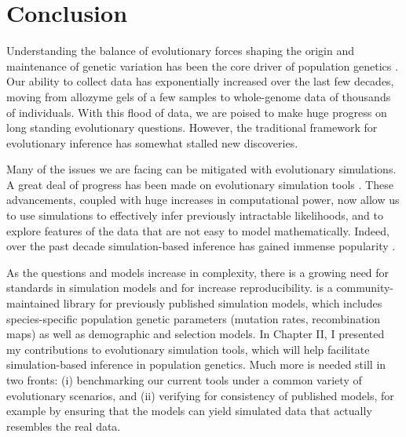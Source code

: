 \chapter{Conclusion}

Understanding the balance of evolutionary forces shaping the origin and maintenance of genetic variation has been the core driver of population genetics \citep{lewontin_genetic_1974}.
Our ability to collect data has exponentially increased over the last few decades, moving from allozyme gels of a few samples to whole-genome data of thousands of individuals.
With this flood of data, we are poised to make huge progress on long standing evolutionary questions.
However, the traditional framework for evolutionary inference has somewhat stalled new discoveries.

Many of the issues we are facing can be mitigated with evolutionary simulations.
A great deal of progress has been made on evolutionary simulation tools \citep{haller_slim_2019,kelleher_efficient_2016, haller_tree-sequence_2019,adrion_community-maintained_2020}.
These advancements, coupled with huge increases in computational power, now allow us to use simulations to effectively infer previously intractable likelihoods,
and to explore features of the data that are not easy to model mathematically.
Indeed, over the past decade simulation-based inference has gained immense popularity \citep{schrider_shic_2016,torres_human_2018,caldas_inference_2022,chan_likelihood-free_2018,korfmann_simultaneous_2023}.

As the questions and models increase in complexity, 
there is a growing need for standards in simulation models and for increase reproducibility.
\stdpopsim is a community-maintained library for previously published simulation models, 
which includes species-specific population genetic parameters (\eg mutation rates, recombination maps) as well as demographic and selection models.
In Chapter II, I presented my contributions to evolutionary simulation tools,
which will help facilitate simulation-based inference in population genetics.
Much more is needed still in two fronts:
(i) benchmarking our current tools under a common variety of evolutionary scenarios, and
(ii) verifying for consistency of published models, for example by ensuring that the models can yield simulated data that actually resembles the real data.


